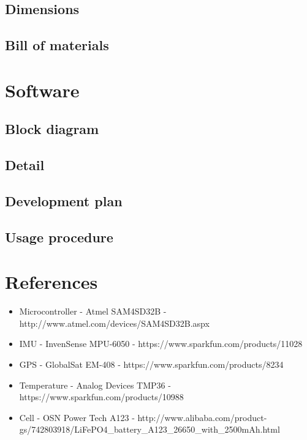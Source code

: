 \documentclass[a4paper, twoside]{article}
\begin{document}
\subsection{Dimensions}

\subsection{Bill of materials}

\section{Software}

\subsection{Block diagram}

\subsection{Detail} %

\subsection{Development plan}

\subsection{Usage procedure}

\section{References}
\begin{itemize}
	\item{Microcontroller - Atmel SAM4SD32B - http://www.atmel.com/devices/SAM4SD32B.aspx}
	\item{IMU - InvenSense MPU-6050 - https://www.sparkfun.com/products/11028}
	\item{GPS - GlobalSat EM-408 - https://www.sparkfun.com/products/8234}
	\item{Temperature - Analog Devices TMP36 - https://www.sparkfun.com/products/10988}
	\item{Cell - OSN Power Tech A123 -
		http://www.alibaba.com/product-gs/742803918/LiFePO4\_battery\_A123\_26650\_with\_2500mAh.html}
\end{itemize}
\end{document}
